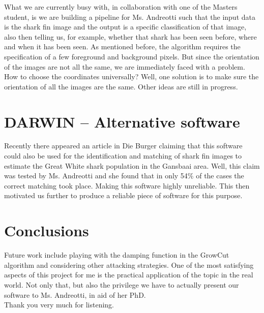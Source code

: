 \documentclass[a4paper,10pt]{article}
\begin{document}
What we are currently busy with, in collaboration with one of the Masters
student, is we are building a pipeline for Ms. Andreotti
such that the input data is the shark fin image and the output is a specific
classification of that image,
also then telling us, for example, whether that shark has been seen before, where and when
it has been seen.
As mentioned before, the
algorithm requires the specification of a few foreground and background pixels. 
But since the orientation of the images are not all the same, we are immediately
faced with a problem. How to choose the coordinates universally?  Well, one
solution is to make sure the orientation of all the images are the same.
Other ideas are still in progress.


\section{DARWIN -- Alternative software}
Recently there appeared an article in Die Burger claiming
that this software could also be used for the identification and matching of
shark fin images to estimate the Great White shark population in the Gansbaai
area.  Well, this claim was tested by Ms. Andreotti and she found that in only
54\% of the cases the correct matching took place.  Making this software highly
unreliable. This then motivated us further to produce a reliable piece of
software for this purpose.


\section{Conclusions}
Future work include playing with the damping function in the GrowCut algorithm and considering other
attacking strategies.
One of the most satisfying aspects of this project for me is the practical
application of the topic in the real world.  Not only that, but also the
privilege we have to actually present our software to Ms. Andreotti, in aid of
her PhD.   \\

Thank you very much for listening.
\end{document}
